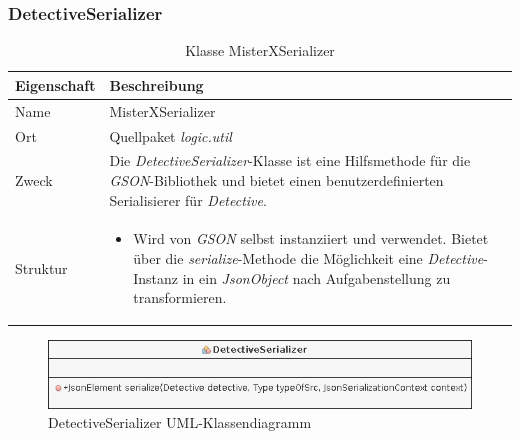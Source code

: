     \subsubsection{DetectiveSerializer}
        \begin{table}[H]
            \caption{Klasse MisterXSerializer}
            \begin{tabular}{p{2.5cm}  p{9.5cm}} 
                \hline
                \textbf{Eigenschaft} & \textbf{Beschreibung}\\
                \hline
                Name & MisterXSerializer\\
                Ort & Quellpaket \textit{logic.util}\\
                \hline
                Zweck &
                Die \textit{DetectiveSerializer}-Klasse ist eine Hilfsmethode für die \textit{GSON}-Bibliothek
                und bietet einen benutzerdefinierten Serialisierer für \textit{Detective}.
                \\
                \hline
                Struktur &
                \begin{itemize}
                    \itemsep0em
                    \item Wird von \textit{GSON} selbst instanziiert und verwendet.
                    Bietet über die \textit{serialize}-Methode die Möglichkeit eine \textit{Detective}-Instanz in ein \textit{JsonObject}
                    nach Aufgabenstellung zu transformieren.
                \end{itemize}
                \\
                \hline
            \end{tabular}
        \end{table}
        \begin{figure}[H]
            \centering
            \includegraphics[scale=0.6]{img/uml/detectiveSerializer.png}   
            \caption{DetectiveSerializer UML-Klassendiagramm}
        \end{figure}

